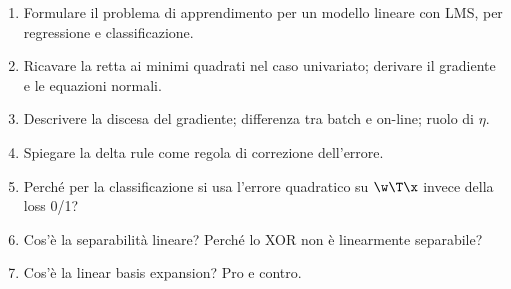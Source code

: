 \begin{domande}
\begin{enumerate}
  \item Formulare il problema di apprendimento per un modello lineare con LMS, per regressione e classificazione.
  \item Ricavare la retta ai minimi quadrati nel caso univariato; derivare il gradiente e le equazioni normali.
  \item Descrivere la discesa del gradiente; differenza tra batch e on-line; ruolo di $\eta$.
  \item Spiegare la delta rule come regola di correzione dell'errore.
  \item Perché per la classificazione si usa l'errore quadratico su $\w\T\x$ invece della loss 0/1?
  \item Cos'è la separabilità lineare? Perché lo XOR non è linearmente separabile?
  \item Cos'è la linear basis expansion? Pro e contro.
\end{enumerate}
\end{domande}
